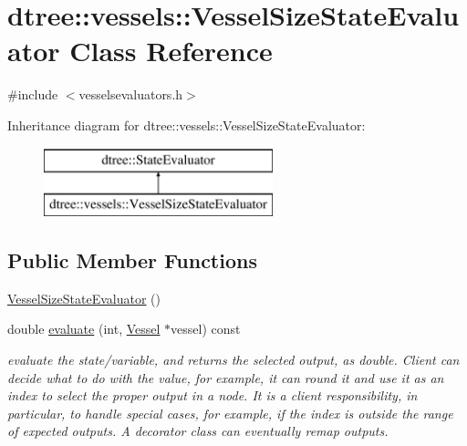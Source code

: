 \hypertarget{classdtree_1_1vessels_1_1_vessel_size_state_evaluator}{}\section{dtree\+::vessels\+::Vessel\+Size\+State\+Evaluator Class Reference}
\label{classdtree_1_1vessels_1_1_vessel_size_state_evaluator}


{\ttfamily \#include $<$vesselsevaluators.\+h$>$}

Inheritance diagram for dtree\+::vessels\+::Vessel\+Size\+State\+Evaluator\+:\begin{figure}[H]
\begin{center}
\leavevmode
\includegraphics[height=2.000000cm]{dd/df6/classdtree_1_1vessels_1_1_vessel_size_state_evaluator}
\end{center}
\end{figure}
\subsection*{Public Member Functions}
\begin{DoxyCompactItemize}
\item 
\mbox{\hyperlink{classdtree_1_1vessels_1_1_vessel_size_state_evaluator_a6b0c9e05cf0fc4c43625e4c6a1dbd234}{Vessel\+Size\+State\+Evaluator}} ()
\item 
double \mbox{\hyperlink{classdtree_1_1vessels_1_1_vessel_size_state_evaluator_af698d80a67d26f0184b0f83454905bb4}{evaluate}} (int, \mbox{\hyperlink{class_vessel}{Vessel}} $\ast$vessel) const
\begin{DoxyCompactList}\small\item\em evaluate the state/variable, and returns the selected output, as double. Client can decide what to do with the value, for example, it can round it and use it as an index to select the proper output in a node. It is a client responsibility, in particular, to handle special cases, for example, if the index is outside the range of expected outputs. A decorator class can eventually remap outputs. \end{DoxyCompactList}\end{DoxyCompactItemize}



